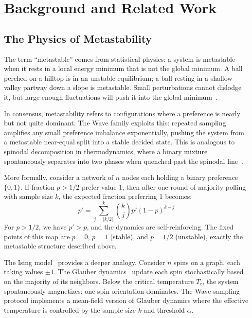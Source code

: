 \documentclass[11pt,a4paper]{article}
\begin{document}
\section{Background and Related Work}
\label{sec:background}

\subsection{The Physics of Metastability}

The term ``metastable'' comes from statistical physics: a system is metastable when it rests
in a local energy minimum that is not the global minimum. A ball perched on a hilltop is in
an unstable equilibrium; a ball resting in a shallow valley partway down a slope is
metastable. Small perturbations cannot dislodge it, but large enough fluctuations will push
it into the global minimum~\cite{landau1980statistical}.

In consensus, metastability refers to configurations where a preference is nearly but not
quite dominant. The Wave family exploits this: repeated sampling amplifies any small
preference imbalance exponentially, pushing the system from a metastable near-equal split
into a stable decided state. This is analogous to spinodal decomposition in thermodynamics,
where a binary mixture spontaneously separates into two phases when quenched past the
spinodal line~\cite{binder1987theory}.

More formally, consider a network of $n$ nodes each holding a binary preference $\{0, 1\}$.
If fraction $p > 1/2$ prefer value 1, then after one round of majority-polling with sample
size $k$, the expected fraction preferring 1 becomes:
\begin{equation}
p' = \sum_{j=\lceil k/2 \rceil}^{k} \binom{k}{j} p^j (1-p)^{k-j}
\label{eq:single_round}
\end{equation}
For $p > 1/2$, we have $p' > p$, and the dynamics are self-reinforcing. The fixed points of
this map are $p=0$, $p=1$ (stable), and $p=1/2$ (unstable), exactly the metastable
structure described above.

The Ising model~\cite{ising1925beitrag} provides a deeper analogy. Consider $n$ spins on a
graph, each taking values $\pm 1$. The Glauber dynamics~\cite{glauber1963time} update each
spin stochastically based on the majority of its neighbors. Below the critical temperature
$T_c$, the system spontaneously magnetizes: one spin orientation dominates. The Wave
sampling protocol implements a mean-field version of Glauber dynamics where the effective
temperature is controlled by the sample size $k$ and threshold $\alpha$.
\end{document}
